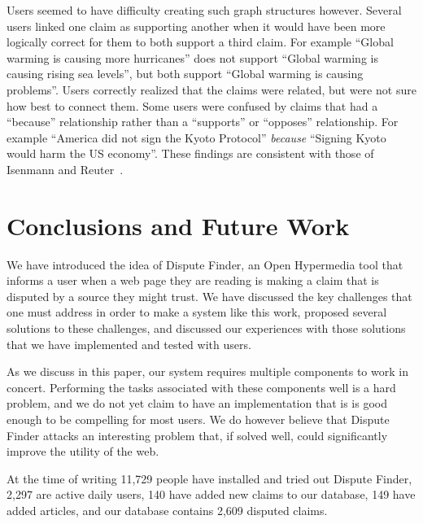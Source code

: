 \documentclass{www2010-accepted}
\newcommand{\todo}[1]{}
\begin{document}
Users seemed to have difficulty creating such graph structures however. Several users linked one claim as supporting another when it would have been more logically correct for them to both support a third claim. For example ``Global warming is causing more hurricanes'' does not support ``Global warming is causing rising sea levels'', but both support ``Global warming is causing problems''. Users correctly realized that the claims were related, but were not sure how best to connect them. Some users were confused by claims that had a ``because'' relationship rather than a ``supports'' or ``opposes'' relationship. For example ``America did not sign the Kyoto Protocol'' {\it because} ``Signing Kyoto would harm the US economy''. These findings are consistent with those of Isenmann and Reuter~\cite{Isenmann1997}.




\todo{Need to say that the argumentation graph contains all existing claims and that it was a simple ``supports"/``opposes'' graph.}

\todo{Come up with terminology for marking an evidence snippet, and agree on evidence vs source vs article}
\todo{Talk about how the early versions conflated evidence and snippets - and whether it makes sense to distinguish between them}
\todo{Screenshot of the claim graph interface}


\section{Conclusions and Future Work}

We have introduced the idea of Dispute Finder, an Open Hypermedia tool that informs a user when a web page they are reading is making a claim that is disputed by a source they might trust. We have discussed the key challenges that one must address in order to make a system like this work, proposed several solutions to these challenges, and discussed our experiences with those solutions that we have implemented and tested with users.

As we discuss in this paper, our system requires multiple components to work in concert. Performing the tasks associated with these components well is a hard problem, and we do not yet claim to have an implementation that is is good enough to be compelling for most users. We do however believe that Dispute Finder attacks an interesting problem that, if solved well, could significantly improve the utility of the web.

At the time of writing 11,729 people have installed and tried out Dispute Finder, 2,297 are active daily users, 140 have added new claims to our database, 149 have added articles, and our database contains 2,609 disputed claims. 
\end{document}
